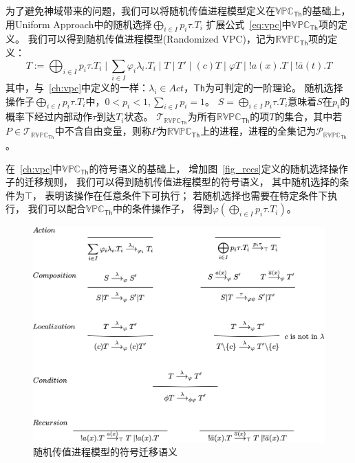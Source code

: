 为了避免神域带来的问题，我们可以将随机传值进程模型定义在$\mathbb{VPC}_{\mathsf{Th}}$的基础上，
用Uniform Approach中的随机选择$\bigoplus_{i\in I}p_i\tau.T_i$
扩展公式~\ref{eq:vpc}中$\mathbb{VPC}_{\mathsf{Th}}$项的定义。
我们可以得到随机传值进程模型(Randomized VPC)，记为$\mathbb{RVPC}_{\mathsf{Th}}$项的定义：
\begin{equation}\label{eq:rvpc}
   T:=\bigoplus_{i\in I}p_i \tau.T_i\mid \sum_{i\in I} \varphi_i\lambda_i.T_i\mid T \mid T'\mid (c)T\mid \varphi T\mid !a(x).T \mid !\bar{a}(t).T
\end{equation}
其中，与~\ref{ch:vpc}中定义的一样：$\lambda_i \in Act$，$\mathsf{Th}$为可判定的一阶理论。
随机选择操作子$\bigoplus_{i\in I}p_i\tau.T_i$中，$0<p_i<1, \sum_{i\in I}p_i = 1$。
$S=\bigoplus_{i\in I}p_i\tau.T_i$意味着$S$在$p_i$的概率下经过内部动作$\tau$到达$T_i$状态。
$\mathcal{T}_{\mathbb{RVPC}_{\mathsf{Th}}}$为所有$\mathbb{RVPC}_\mathsf{Th}$的项$T$的集合，其中若$P\in \mathcal{T}_{\mathbb{RVPC}_{\mathsf{Th}}}$中不含自由变量，则称$P$为$\mathbb{RVPC}_{\mathsf{Th}}$上的进程，进程的全集记为$\mathcal{P}_{\mathbb{RVPC}_{\mathsf{Th}}}$。

在~\ref{ch:vpc}中$\mathbb{VPC}_{\mathsf{Th}}$的符号语义的基础上，
增加图~\ref{fig_rccs}定义的随机选择操作子的迁移规则，
我们可以得到随机传值进程模型的符号语义，
其中随机选择的条件为$\top$，
表明该操作在任意条件下可执行；
若随机选择也需要在特定条件下执行，
我们可以配合$\mathbb{VPC}_{\mathsf{Th}}$中的条件操作子，
得到$\varphi (\bigoplus_{i\in I}p_i\tau.T_i)$。

\begin{figure}[!htbp]
	\small
	\centering
	\includegraphics[width=14cm]{../figures/symbolic_sematic.png}
    \caption{随机传值进程模型的符号迁移语义}
    \label{fig_sematic}
\end{figure}

